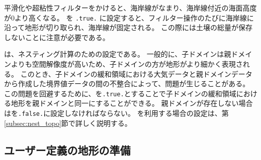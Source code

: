 平滑化や超粘性フィルターをかけると、海岸線がなまり、海岸線付近の海面高度が0より高くなる。
 を \verb|.true.| に設定すると、フィルター操作のたびに海岸線に沿って地形が切り取られ、海岸線が固定される。
この際には土壌の総量が保存しないことに注意が必要である。

は、ネスティング計算のための設定である。
一般的に、子ドメインは親ドメインよりも空間解像度が高いため、子ドメインの方が地形がより細かく表現される。
このとき、子ドメインの緩和領域における大気データと親ドメインデータから作成した境界値データの間の不整合によって、問題が生じることがある。
この問題を回避するために、を\verb|.true.|とすることで子ドメインの緩和領域における地形を親ドメインと同一にすることができる。
親ドメインが存在しない場合はを\verb|.false.|に設定しなければならない。
を利用する場合の設定は、第\ref{subsec:nest_topo}節で詳しく説明する。


\subsection{ユーザー定義の地形の準備} \label{subsec:topo_userfile}

